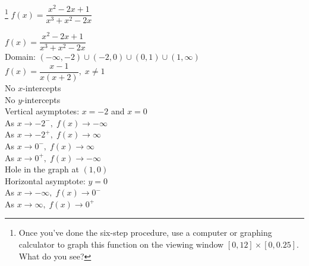 
{\footnote{Once you've done the six-step procedure, use a computer or graphing calculator to graph this function on the viewing window $[0, 12] \times [0, 0.25]$.  What do you see?} $f(x) = \dfrac{x^{2} - 2x + 1}{x^{3} + x^{2} - 2x}$ }
{$f(x) = \dfrac{x^{2} - 2x + 1}{x^{3} + x^{2} - 2x}$\\
Domain: $(-\infty, -2) \cup (-2, 0) \cup (0, 1) \cup (1, \infty)$\\
$f(x) = \dfrac{x - 1}{x(x + 2)}, \; x \neq 1$\\
No $x$-intercepts\\
No $y$-intercepts\\
Vertical asymptotes: $x = -2$ and $x = 0$\\
As $x \rightarrow -2^{-}, \; f(x) \rightarrow -\infty$\\
As $x \rightarrow -2^{+}, \; f(x) \rightarrow \infty$\\
As $x \rightarrow 0^{-}, \; f(x) \rightarrow \infty$\\
As $x \rightarrow 0^{+}, \; f(x) \rightarrow -\infty$\\
Hole in the graph at $(1, 0)$\\
Horizontal asymptote: $y = 0$\\
As $x \rightarrow -\infty, \; f(x) \rightarrow 0^{-}$\\
As $x \rightarrow \infty, \; f(x) \rightarrow 0^{+}$


\begin{center}
\end{center}}

